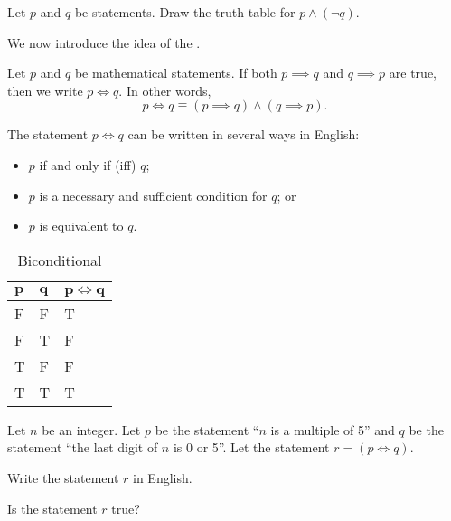 \begin{exercise}\label{exercise-negation-of-implication}
    Let $p$ and $q$ be statements. Draw the truth table for $p \land (\lnot q)$.
\end{exercise}

We now introduce the idea of the .
\begin{definition}
    Let $p$ and $q$ be mathematical statements. If both $p \implies q$ and $q \implies p$ are true, then we write $p \iff q$. In other words,
    \[
        p \iff q \equiv (p \implies q) \land (q \implies p).
    \]
\end{definition}
\begin{remark}
    The statement $p \iff q$ can be written in several ways in English:
    \begin{itemize}
        \item $p$ if and only if (iff) $q$;
        \item $p$ is a necessary and sufficient condition for $q$; or
        \item $p$ is equivalent to $q$.
    \end{itemize}
\end{remark}

\begin{table}[h]
    \centering
    \begin{tabular}{|l|l||l|}
        \hline
        $\boldsymbol{p}$ & $\boldsymbol{q}$ & $\boldsymbol{p \iff q}$ \\ \hline
        F   & F   & T         \\ \hline
        F   & T   & F         \\ \hline
        T   & F   & F         \\ \hline
        T   & T   & T         \\ \hline
    \end{tabular}
    \caption{Biconditional}
\end{table}

\begin{exercise}
    Let $n$ be an integer. Let $p$ be the statement ``$n$ is a multiple of 5'' and $q$ be the statement ``the last digit of $n$ is 0 or 5''. Let the statement $r = (p \iff q)$.
    \begin{partquestions}{\roman*}
        \item Write the statement $r$ in English.
        \item Is the statement $r$ true?
    \end{partquestions}
\end{exercise}

